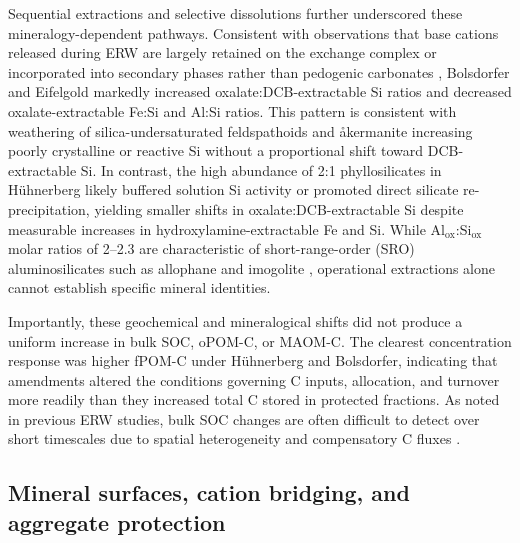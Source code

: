 \documentclass[preprint,12pt]{elsarticle}
\begin{document}
Sequential extractions and selective dissolutions further underscored these mineralogy-dependent pathways. Consistent with observations that base cations released during ERW are largely retained on the exchange complex or incorporated into secondary phases rather than pedogenic carbonates \citep{steinwidder2025beyond}, Bolsdorfer and Eifelgold markedly increased oxalate:DCB-extractable Si ratios and decreased oxalate-extractable Fe:Si and Al:Si ratios. This pattern is consistent with weathering of silica-undersaturated feldspathoids and \aa kermanite increasing poorly crystalline or reactive Si without a proportional shift toward DCB-extractable Si. In contrast, the high abundance of 2:1 phyllosilicates in H\"uhnerberg likely buffered solution Si activity or promoted direct silicate re-precipitation, yielding smaller shifts in oxalate:DCB-extractable Si despite measurable increases in hydroxylamine-extractable Fe and Si. While Al$_{\mathrm{ox}}$:Si$_{\mathrm{ox}}$ molar ratios of 2--2.3 are characteristic of short-range-order (SRO) aluminosilicates such as allophane and imogolite \citep{Watanabe2023}, operational extractions alone cannot establish specific mineral identities.

Importantly, these geochemical and mineralogical shifts did not produce a uniform increase in bulk SOC, oPOM-C, or MAOM-C. The clearest concentration response was higher fPOM-C under H\"uhnerberg and Bolsdorfer, indicating that amendments altered the conditions governing C inputs, allocation, and turnover more readily than they increased total C stored in protected fractions. As noted in previous ERW studies, bulk SOC changes are often difficult to detect over short timescales due to spatial heterogeneity and compensatory C fluxes \citep{Poeplau2022,steinwidder2025beyond}.

\subsection{Mineral surfaces, cation bridging, and aggregate protection}
\label{subsec:stabilization}
\end{document}
